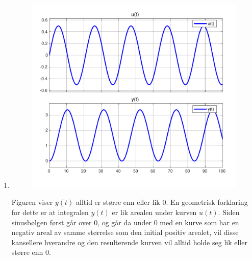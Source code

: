 \documentclass[answers,11pt]{exam}
\begin{document}
\begin{enumerate}[label=\alph*)]
\begin{tcolorbox}
    \begin{enumerate}[label=o\arabic*)]
      \item
            \parbox{\textwidth}{
              \begin{figure}[H]
                \centering
                \hspace{0mm}\scalebox{0.60}
                {\includegraphics{figurer/sinus_integral.pdf}}
                \label{fig:2o1}
              \end{figure}
            }
            Figuren viser $y(t)$ alltid er større enn eller lik 0. En geometrisk
            forklaring for dette er at integralen $y(t)$ er lik arealen under kurven
            $u(t)$. Siden sinusbølgen først går over 0, og går da under 0 med en kurve
            som har en negativ areal av samme størrelse som den initial positiv arealet,
            vil disse kansellere hverandre og den resulterende kurven vil alltid holde
            seg lik eller større enn 0.


\end{enumerate}
\end{tcolorbox}
\end{enumerate}
\end{document}
